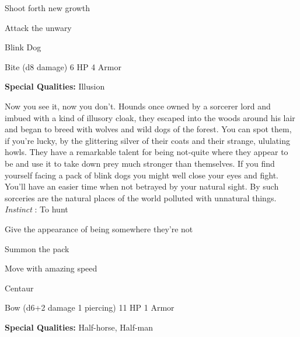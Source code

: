 \startitemize[1,packed]
         
\item Shoot forth new growth

         
\item Attack the unwary

       
\stopitemize
       
\startMonsterName
Blink Dog	 
\stopMonsterName
       

Bite (d8 damage)	6 HP	4 Armor

       


       
\startMonsterQualities
         {\bf Special Qualities:}  Illusion
\stopMonsterQualities
       
\startMonsterDescription
Now you see it, now you don’t. Hounds once owned by a sorcerer lord and imbued with a kind of illusory cloak, they escaped into the woods around his lair and began to breed with wolves and wild dogs of the forest. You can spot them, if you’re lucky, by the glittering silver of their coats and their strange, ululating howls. They have a remarkable talent for being not-quite where they appear to be and use it to take down prey much stronger than themselves. If you find yourself facing a pack of blink dogs you might well close your eyes and fight. You’ll have an easier time when not betrayed by your natural sight. By such sorceries are the natural places of the world polluted with unnatural things. {\em Instinct} : To hunt
\stopMonsterDescription
       
\startitemize[1,packed]
         
\item Give the appearance of being somewhere they're not

         
\item Summon the pack

         
\item Move with amazing speed

       
\stopitemize
       
\startMonsterName
Centaur	 
\stopMonsterName
       

Bow (d6+2 damage 1 piercing)	11 HP	1 Armor

       


       
\startMonsterQualities
         {\bf Special Qualities:}  Half-horse, Half-man
\stopMonsterQualities
       
